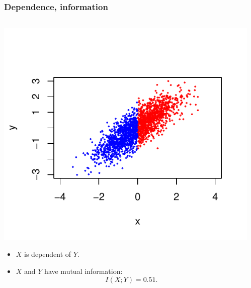 \documentclass{beamer}
\begin{document}

\begin{frame}
\frametitle{Dependence, information}
\begin{columns}
\begin{column}{0.5\textwidth}
\begin{center}
\includegraphics[scale = 0.4, clip = true, trim = 0.1in 0.1in 0.1in 0.2in]{../diagram/ddi_2a.pdf}
\end{center}
\begin{itemize}
\item $X$ is dependent of $Y$.
\item $X$ and $Y$ have mutual information:
\[
I(X; Y) = 0.51.
\]
\end{itemize}
\end{column}
\begin{column}{0.5\textwidth}
\end{column}
\end{columns}
\end{frame}
\end{document}
